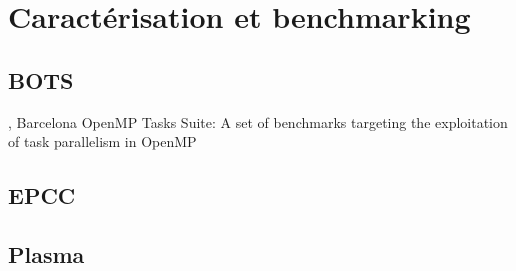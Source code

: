 \section{Caractérisation et benchmarking}\label{sec:rw:benchmarking}


\subsection{BOTS}

\cite{Duran2009}, Barcelona OpenMP Tasks Suite: A set of benchmarks targeting the exploitation of task parallelism in OpenMP

\subsection{EPCC}
\subsection{Plasma}

